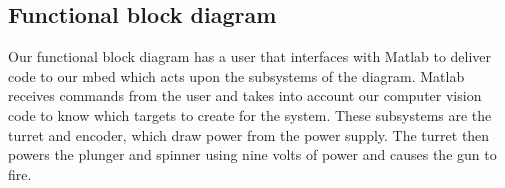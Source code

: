 \documentclass{article}
\begin{document}
%
%
%   
%   
%  
%   
%   
%
%   
%   
%   
%  
%

\subsection{Functional block diagram}
Our functional block diagram has a user that interfaces with Matlab to deliver code to our mbed which acts upon the subsystems of the diagram. Matlab receives commands from the user and takes into account our computer vision code to know which targets to create for the system. These subsystems are the turret and encoder, which draw power from the power supply. The turret then powers the plunger and spinner using nine volts of power and causes the gun to fire.
\end{document}
